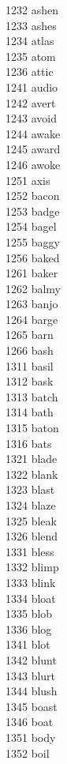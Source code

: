 1232 ashen \\
1233 ashes \\
1234 atlas \\
1235 atom \\
1236 attic \\
1241 audio \\
1242 avert \\
1243 avoid \\
1244 awake \\
1245 award \\
1246 awoke \\
1251 axis \\
1252 bacon \\
1253 badge \\
1254 bagel \\
1255 baggy \\
1256 baked \\
1261 baker \\
1262 balmy \\
1263 banjo \\
1264 barge \\
1265 barn \\
1266 bash \\
1311 basil \\
1312 bask \\
1313 batch \\
1314 bath \\
1315 baton \\
1316 bats \\
1321 blade \\
1322 blank \\
1323 blast \\
1324 blaze \\
1325 bleak \\
1326 blend \\
1331 bless \\
1332 blimp \\
1333 blink \\
1334 bloat \\
1335 blob \\
1336 blog \\
1341 blot \\
1342 blunt \\
1343 blurt \\
1344 blush \\
1345 boast \\
1346 boat \\
1351 body \\
1352 boil \\
